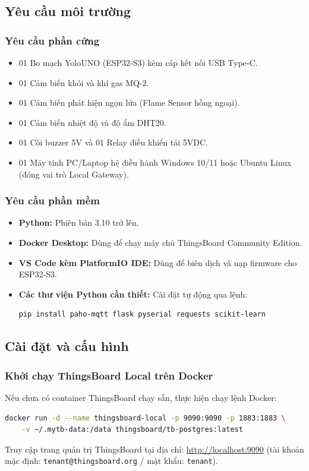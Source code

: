 \subsection{Yêu cầu môi trường}
\subsubsection{Yêu cầu phần cứng}
\begin{itemize}
    \item 01 Bo mạch YoloUNO (ESP32-S3) kèm cáp kết nối USB Type-C.
    \item 01 Cảm biến khói và khí gas MQ-2.
    \item 01 Cảm biến phát hiện ngọn lửa (Flame Sensor hồng ngoại).
    \item 01 Cảm biến nhiệt độ và độ ẩm DHT20.
    \item 01 Còi buzzer 5V và 01 Relay điều khiển tải 5VDC.
    \item 01 Máy tính PC/Laptop hệ điều hành Windows 10/11 hoặc Ubuntu Linux (đóng vai trò Local Gateway).
\end{itemize}

\subsubsection{Yêu cầu phần mềm}
\begin{itemize}
    \item \textbf{Python:} Phiên bản 3.10 trở lên.
    \item \textbf{Docker Desktop:} Dùng để chạy máy chủ ThingsBoard Community Edition.
    \item \textbf{VS Code kèm PlatformIO IDE:} Dùng để biên dịch và nạp firmware cho ESP32-S3.
    \item \textbf{Các thư viện Python cần thiết:} Cài đặt tự động qua lệnh:
    \begin{lstlisting}[language=bash, style=mystyle]
pip install paho-mqtt flask pyserial requests scikit-learn
    \end{lstlisting}
\end{itemize}

\subsection{Cài đặt và cấu hình}
\subsubsection{Khởi chạy ThingsBoard Local trên Docker}
Nếu chưa có container ThingsBoard chạy sẵn, thực hiện chạy lệnh Docker:
\begin{lstlisting}[language=bash, style=mystyle]
docker run -d --name thingsboard-local -p 9090:9090 -p 1883:1883 \
    -v ~/.mytb-data:/data thingsboard/tb-postgres:latest
\end{lstlisting}
Truy cập trang quản trị ThingsBoard tại địa chỉ: \url{http://localhost:9090} (tài khoản mặc định: \texttt{tenant@thingsboard.org} / mật khẩu: \texttt{tenant}).


